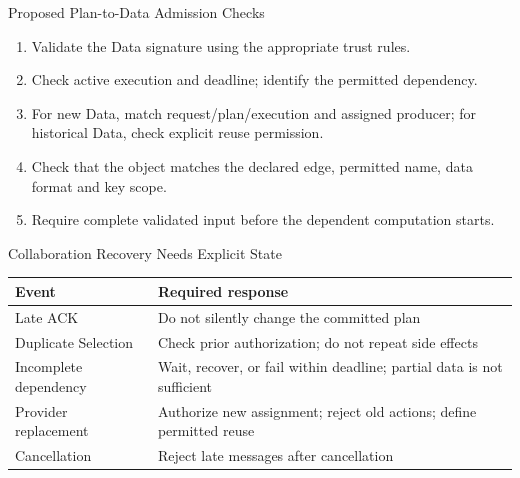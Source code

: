 \begin{frame}{Proposed Plan-to-Data Admission Checks}
\begin{enumerate}
\item Validate the Data signature using the appropriate trust rules.
\item Check active execution and deadline; identify the permitted dependency.
\item For new Data, match request/plan/execution and assigned producer; for historical Data, check explicit reuse permission.
\item Check that the object matches the declared edge, permitted name, data format and key scope.
\item Require complete validated input before the dependent computation starts.
\end{enumerate}
\vspace{3mm}
\end{frame}

\begin{frame}{Collaboration Recovery Needs Explicit State}
\small
\begin{tabularx}{\linewidth}{p{.3\linewidth}X}
\toprule Event & Required response\\\midrule
Late ACK & Do not silently change the committed plan\\\midrule
Duplicate Selection & Check prior authorization; do not repeat side effects\\\midrule
Incomplete dependency & Wait, recover, or fail within deadline; partial data is not sufficient\\\midrule
Provider replacement & Authorize new assignment; reject old actions; define permitted reuse\\\midrule
Cancellation & Reject late messages after cancellation\\\bottomrule
\end{tabularx}
\vspace{3mm}
\end{frame}

